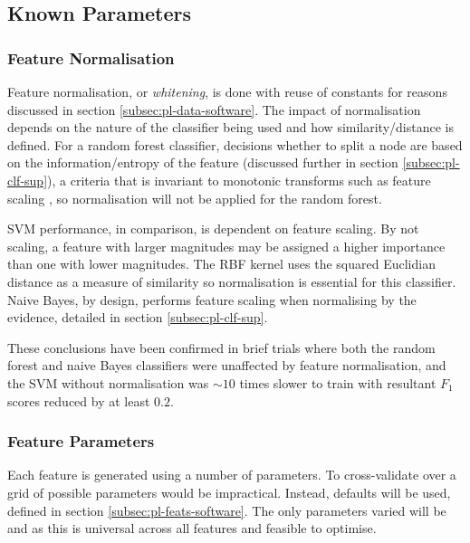     \subsection{Known Parameters}
    \label{subsec:exp-clf-known}  
        \subsubsection{Feature Normalisation}
        \label{subsubsec:exp-clf-known-featnorm}
            Feature normalisation, or \textit{whitening}, is done with reuse of constants for reasons discussed in section \ref{subsec:pl-data-software}. The impact of normalisation depends on the nature of the classifier being used and how similarity/distance is defined. For a random forest classifier, decisions whether to split a node are based on the information/entropy of the feature (discussed further in section \ref{subsec:pl-clf-sup}), a criteria that is invariant to monotonic transforms such as feature scaling \cite{Hastie2009}, so normalisation will not be applied for the random forest.
            
            SVM performance, in comparison, is dependent on feature scaling. By not scaling, a feature with larger magnitudes may be assigned a higher importance than one with lower magnitudes. The RBF kernel uses the squared Euclidian distance as a measure of similarity so normalisation is essential for this classifier. Naive Bayes, by design, performs feature scaling when normalising by the evidence, detailed in section \ref{subsec:pl-clf-sup}.
            
            These conclusions have been confirmed in brief trials where both the random forest and naive Bayes classifiers were unaffected by feature normalisation, and the SVM without normalisation was $\sim10$ times slower to train with resultant $F_{1}$ scores reduced by at least $0.2$.
    
            
        \subsubsection{Feature Parameters}
        \label{subsubsec:exp-clf-known-featparam}
            Each feature is generated using a number of parameters. To cross-validate over a grid of possible parameters would be impractical. Instead, defaults will be used, defined in section \ref{subsec:pl-feats-software}. The only parameters varied will be  and  as this is universal across all features and feasible to optimise.
        

